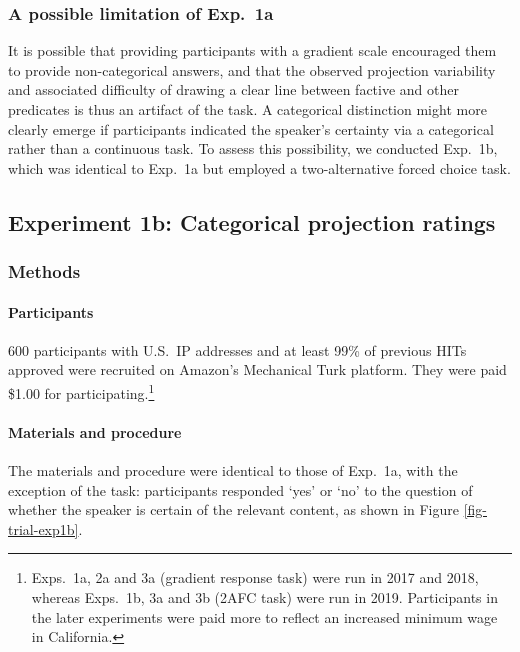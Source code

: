 \documentclass[11pt,fleqn]{article}
\newcommand{\6}{\mbox{$[\hspace*{-.6mm}[$}}
\newcommand{\9}{\mbox{$]\hspace*{-.6mm}]$}}
\begin{document}
\subsubsection{A possible limitation of Exp.~1a}

It is possible that providing participants with a gradient scale encouraged them to provide non-categorical answers, and that the observed projection variability and associated difficulty of drawing a clear line between factive and other predicates is thus an artifact of the task. A categorical distinction might more clearly emerge if participants indicated the speaker's certainty via a categorical rather than a continuous task. To assess this possibility, we conducted Exp.~1b, which was identical to Exp.~1a but employed a two-alternative forced choice task.

\subsection{Experiment 1b: Categorical projection ratings}

\subsubsection{Methods}

\paragraph{Participants} 600 participants with U.S.\ IP addresses and at least 99\% of previous HITs approved were recruited on Amazon's Mechanical Turk platform. They were paid \$1.00 for participating.\footnote{Exps.~1a, 2a and 3a (gradient response task) were run in 2017 and 2018, whereas  Exps.~1b, 3a and 3b (2AFC task) were run in 2019. Participants in the later experiments were paid more to reflect an increased minimum wage in California.}


\paragraph{Materials and procedure} The materials and procedure were identical to those of Exp.~1a, with the exception of the task: participants responded `yes' or `no' to the question of whether the speaker is certain of the relevant content, as shown in Figure \ref{fig-trial-exp1b}.
\end{document}

